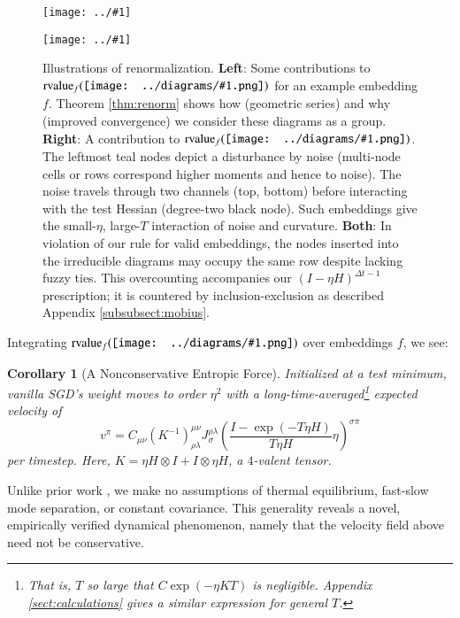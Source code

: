 \documentclass{article}
\theoremstyle{plain}
\newtheorem{cor}{Corollary}
\theoremstyle{definition}
\newcommand{\rvalue}{\text{\textnormal{rvalue}}}
\newcommand{\wrap}[1]{\left(#1\right)}
\newcommand{\plotmooh}[3]{
    \texttt{[image: ../\#1]}
}
\newcommand{\sdia}[1]{\begin{gathered}\texttt{[image: ../diagrams/\#1.png]}\end{gathered}}
\begin{document}
        \begin{figure}[h!]
            \centering  
            \plotmooh{diagrams/spacetime-g}{}{0.210\columnwidth}
            \plotmooh{diagrams/spacetime-h}{}{0.210\columnwidth}
            \caption{
                Illustrations of renormalization.
                {\bf Left}:
                    Some contributions to $\rvalue_f(\sdia{(0-1)(01)})$ for an
                    example embedding $f$.  Theorem \ref{thm:renorm} shows how
                    (geometric series) and why (improved convergence) we
                    consider these diagrams as a group.
                {\bf Right}:
                    A contribution to
                    $\rvalue_f(\sdia{(01-2)(02-12)})$. 
                    The leftmost {\color{mooteal}teal} nodes depict a disturbance by noise
                    (multi-node cells or rows correspond higher moments and
                    hence to noise).  The noise travels through two
                    channels (top, bottom) before interacting with the test
                    Hessian (degree-two black node).  Such embeddings give the
                    small-$\eta$, large-$T$ interaction of noise and curvature. 
                {\bf Both}:
                    In violation of our rule for valid embeddings, the nodes
                    inserted into the irreducible diagrams may occupy the same
                    row despite lacking fuzzy ties.  This
                    overcounting accompanies our $(I-\eta H)^{\Delta t-1}$
                    prescription; it is countered by inclusion-exclusion as
                    described Appendix \ref{subsubsect:mobius}.
            }
            \label{fig:renormspacetime}
        \end{figure}

        Integrating $\rvalue_f(\sdia{(01-2-3)(02-12-23)})$ over embeddings $f$, we see:
        \begin{cor}[A Nonconservative Entropic Force]\label{cor:entropic}
            Initialized at a test minimum, vanilla SGD's weight moves to
            order $\eta^2$ with a long-time-averaged\footnote{
                That is, $T$ so large that $C \exp(-\eta K T)$ is negligible.
                Appendix \ref{sect:calculations} gives a similar expression for general $T$.
            }
            expected velocity of
            $$
                v^\pi = C_{\mu \nu}
                \wrap{K^{-1}}^{\mu\nu}_{\rho\lambda}
                J^{\rho\lambda}_{\sigma}
                \wrap{\frac{I - \exp(-T \eta H)}{T \eta H} \eta}^{\sigma \pi}
            $$
            per timestep.
            Here, $K = \eta H \otimes I + I \otimes \eta H$, a
            $4$-valent tensor. 
        \end{cor}
        Unlike prior work \cite{we19b}, we make no assumptions of thermal
        equilibrium, fast-slow mode separation, or constant covariance.  This
        generality reveals a novel, empirically verified
        dynamical phenomenon, namely that the velocity field above need not be
        conservative.
\end{document}
